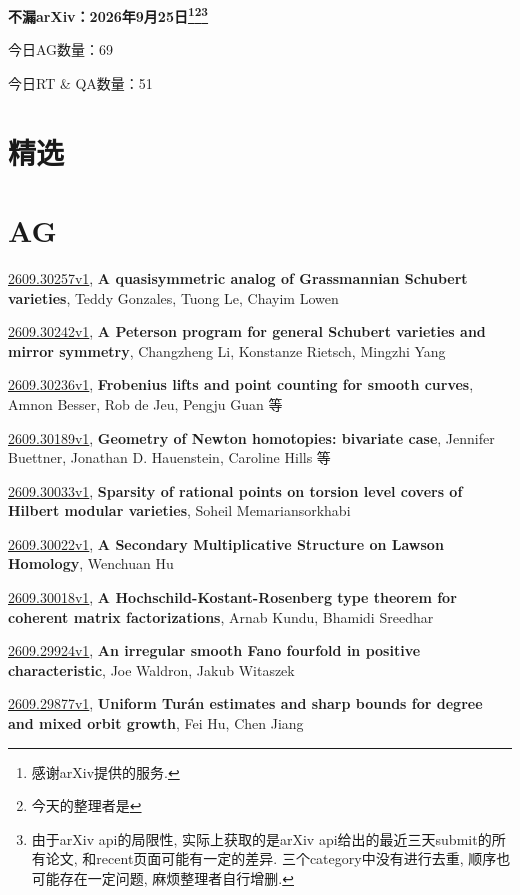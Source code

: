 \documentclass[9pt, a4paper]{article}
\theoremstyle{plain}
\theoremstyle{definition}
\theoremstyle{remark}
\newcommand{\arxiv}[3]{\href{https://arxiv.org/abs/#1}{#1}, \textbf{\textcolor{arxivblue}{#2}}, #3}
\newcommand{\AGnumber}{69}
\newcommand{\RTQAnumber}{51}
\newcommand{\NewestDate}{2026年9月25日}
\newcommand{\todayarXiver}{} %
\begin{document}
\begin{center}
    \Huge\textbf{不漏arXiv：\NewestDate\footnote{感谢arXiv提供的服务.}\footnote{今天的整理者是\todayarXiver}\footnote{由于arXiv api的局限性, 实际上获取的是arXiv api给出的最近三天submit的所有论文, 和recent页面可能有一定的差异. 三个category中没有进行去重, 顺序也可能存在一定问题, 麻烦整理者自行增删.}} \\
\end{center}

\setcounter{section}{-1}

\begin{center}
    今日AG数量：\AGnumber
    
    今日RT \& QA数量：\RTQAnumber
    
\end{center}


\section{精选}


\section{AG}
\arxiv{2609.30257v1}{A quasisymmetric analog of Grassmannian Schubert varieties}{Teddy Gonzales, Tuong Le, Chayim Lowen}

\arxiv{2609.30242v1}{A Peterson program for general Schubert varieties and mirror symmetry}{Changzheng Li, Konstanze Rietsch, Mingzhi Yang}

\arxiv{2609.30236v1}{Frobenius lifts and point counting for smooth curves}{Amnon Besser, Rob de Jeu, Pengju Guan 等}

\arxiv{2609.30189v1}{Geometry of Newton homotopies: bivariate case}{Jennifer Buettner, Jonathan D. Hauenstein, Caroline Hills 等}

\arxiv{2609.30033v1}{Sparsity of rational points on torsion level covers of Hilbert modular varieties}{Soheil Memariansorkhabi}

\arxiv{2609.30022v1}{A Secondary Multiplicative Structure on Lawson Homology}{Wenchuan Hu}

\arxiv{2609.30018v1}{A Hochschild-Kostant-Rosenberg type theorem for coherent matrix factorizations}{Arnab Kundu, Bhamidi Sreedhar}

\arxiv{2609.29924v1}{An irregular smooth Fano fourfold in positive characteristic}{Joe Waldron, Jakub Witaszek}

\arxiv{2609.29877v1}{Uniform Turán estimates and sharp bounds for degree and mixed orbit growth}{Fei Hu, Chen Jiang}
\end{document}

